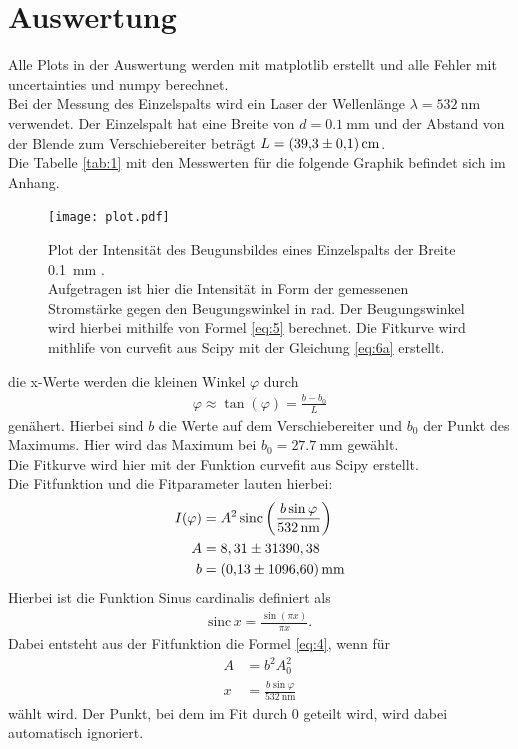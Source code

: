 \section{Auswertung}
Alle Plots in der Auswertung werden mit matplotlib \cite{matplotlib} erstellt und alle
Fehler mit uncertainties \cite{uncertainties} und numpy \cite{numpy} berechnet.\\
Bei der Messung des Einzelspalts wird ein Laser der Wellenlänge $\lambda = \SI{532}{\nano\meter} $ verwendet.
Der Einzelspalt hat eine Breite von $d=\SI{0.1}{\milli\meter} $ und der Abstand von 
der Blende zum Verschiebereiter beträgt $L=\SI{39.3+-0.1}{\centi\meter} $.\\
Die Tabelle \ref{tab:1} mit den Messwerten für die folgende Graphik befindet sich im Anhang.
\begin{figure}[H]
    \centering
    \texttt{[image: plot.pdf]}
    \caption{
        Plot der Intensität des Beugunsbildes eines Einzelspalts der Breite \SI{0.1}{\milli\meter} .\cite{matplotlib}\\
        Aufgetragen ist hier die Intensität in Form der gemessenen Stromstärke
        gegen den Beugungswinkel \varphi in rad. Der Beugungswinkel wird hierbei mithilfe von
        Formel \eqref{eq:5} berechnet. Die Fitkurve wird mithlife von curvefit aus Scipy \cite{scipy}
        mit der Gleichung \eqref{eq:6a} erstellt. 
    } 
    \label{fig:4} 
\end{figure}
\justifying die x-Werte werden die kleinen Winkel $\varphi$ durch 
\begin{align}
    \varphi \approx \tan (\varphi) = \frac{b-b_0}{L} \label{eq:5}
\end{align}
genähert. Hierbei sind $b$ die Werte auf dem Verschiebereiter und $b_0$ der Punkt des Maximums.
Hier wird das Maximum bei $b_0= \SI{27.7}{\milli\meter} $ gewählt.\\
Die Fitkurve wird hier mit der Funktion curvefit aus Scipy \cite{scipy} erstellt.\\
Die Fitfunktion und die Fitparameter lauten hierbei:
\begin{subequations}
\begin{align}
    I(\varphi) &= A^2 \,\text{sinc} \left(\frac{b \sin{\varphi}}{\SI{532}{\nano\meter}} \right) \label{eq:6a}\\
    A &= 8,31 \pm 31390,38 \label{eq:6b}\\
    b &= \SI{0.13+-1096.6}{\milli\meter} \label{eq:6c}
\end{align}
\end{subequations}
Hierbei ist die Funktion Sinus cardinalis definiert als
\begin{align}
    \text{sinc}\,x = \frac{\sin (\pi x)}{\pi x} \label{eq:7} .
\end{align}
Dabei entsteht aus der Fitfunktion die Formel \eqref{eq:4}, wenn für
\begin{align}
    A &= b^2 A_0^2 \label{eq:8} \\
    x &= \frac{b \sin{\varphi}}{\SI{532}{\nano\meter}} \label{eq:9}
\end{align}
wählt wird.
Der Punkt, bei dem im Fit durch 0 geteilt wird, wird dabei automatisch ignoriert.



